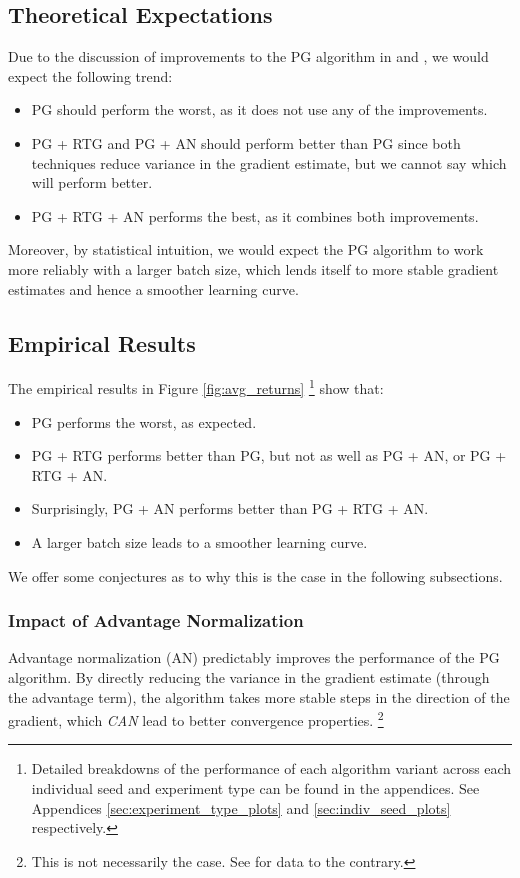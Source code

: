 \documentclass{article} %
\begin{document}
\subsection{Theoretical Expectations}
Due to the discussion of improvements to the PG algorithm in \cite{Levine-et-al-2023} and \cite{Week2},
we would expect the following trend:
\begin{itemize}
    \item PG should perform the worst, as it does not use any of the improvements.
    \item PG + RTG and PG + AN should perform better than PG since both techniques
    reduce variance in the gradient estimate, but we cannot say which will perform better.
    \item PG + RTG + AN performs the best, as it combines both improvements.
\end{itemize}

Moreover, by statistical intuition, we would expect the PG algorithm to work more reliably with a larger batch size,
which lends itself to more stable gradient estimates and hence a smoother learning curve.

\subsection{Empirical Results}
The empirical results in Figure \ref{fig:avg_returns}
\footnote{
    Detailed breakdowns of the performance of each algorithm variant
    across each individual seed and experiment type can be found in the appendices.
    See Appendices \ref{sec:experiment_type_plots} and \ref{sec:indiv_seed_plots} respectively.
} show that:
\begin{itemize}
    \item PG performs the worst, as expected.
    \item PG + RTG performs better than PG, but not as well as PG + AN, or PG + RTG + AN.
    \item Surprisingly, PG + AN performs better than PG + RTG + AN.
    \item A larger batch size leads to a smoother learning curve.
\end{itemize}

We offer some conjectures as to why this is the case in the following subsections.

\subsubsection{Impact of Advantage Normalization}
Advantage normalization (AN) predictably improves the performance of the PG algorithm.
By directly reducing the variance in the gradient estimate (through the advantage term),
the algorithm takes more stable steps in the direction of the gradient,
which \textit{CAN} lead to better convergence properties. 
\footnote{This is not necessarily the case. See \cite{Andrychowicz-et-al-2020} 
for data to the contrary.}
\end{document}
